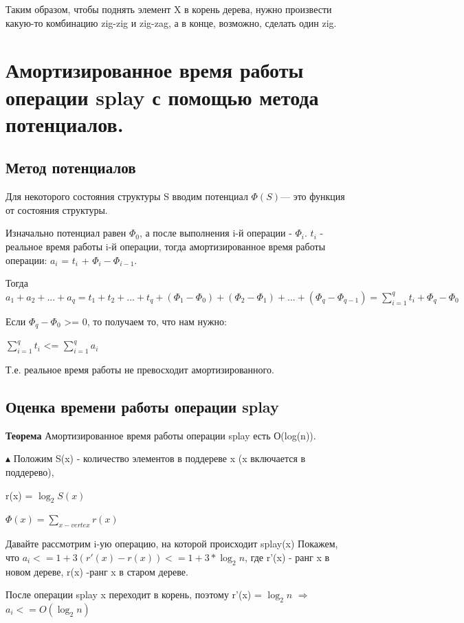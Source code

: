 Таким образом, чтобы поднять элемент X  в корень дерева, нужно произвести какую-то комбинацию zig-zig и zig-zag, а в конце, возможно, сделать один zig.
\section{Амортизированное время работы операции splay с помощью метода потенциалов.}

\subsection*{Метод потенциалов}

Для некоторого состояния структуры S вводим потенциал $\Phi(S)$— это функция от состояния структуры.

Изначально потенциал равен $\Phi_0$, а после выполнения i-й операции - $\Phi_i$.
$t_i$ - реальное время работы i-й операции, тогда амортизированное время работы операции:  $a_i$ = $t_i$ + $\Phi_i - \Phi_{i-1} $.

Тогда $a_1 + a_2 + ... + a_q  = t_1 + t_2 + ... + t_q + (\Phi_1 - \Phi_0) + (\Phi_2 - \Phi_1) + ... + (\Phi_q - \Phi_{q-1}) = \displaystyle\sum_{i=1}^{q} t_i + \Phi_q - \Phi_0$

Если $\Phi_q - \Phi_0$ >= 0, то получаем то, что нам нужно:

$\displaystyle\sum_{i=1}^{q} t_i$ <= $\displaystyle\sum_{i=1}^{q} a_i$ 

Т.е. реальное время работы не превосходит амортизированного.

\subsection*{Оценка времени работы операции splay}
\textbf{Теорема} Амортизированное время работы операции  splay есть О(log(n)).

$\blacktriangle$
Положим S(x) - количество элементов в поддереве x (x  включается в поддерево),

r(x) = $\log_{2}{S(x)}$

$\Phi(x) = \displaystyle\sum_{x - vertex} r(x)$

Давайте рассмотрим i-ую операцию, на которой происходит splay(x)
Покажем, что $a_i <= 1 + 3( r'(x) - r(x)) <= 1 + 3*\log_{2}{n}$, где r'(x) - ранг x  в новом дереве, r(x) -ранг x  в старом дереве.

После операции splay x переходит в корень, поэтому r'(x) = $\log_{2}{n}$ $\Longrightarrow$ $a_i <= O(\log_{2}{n})$

